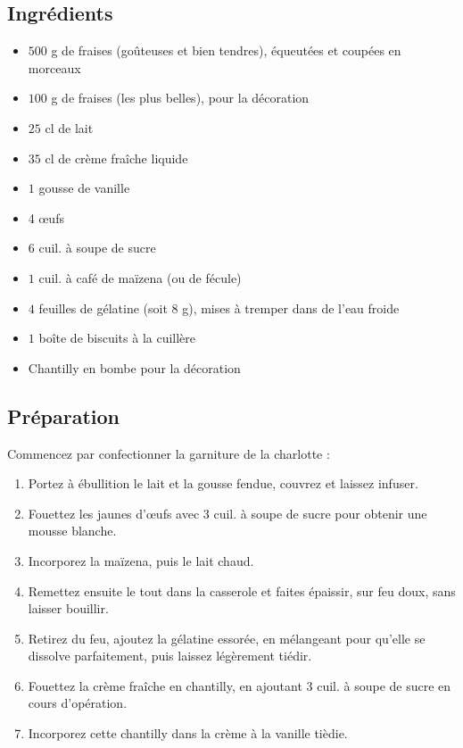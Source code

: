 \subsection*{Ingrédients}
\begin{itemize}
\item $500$ g de fraises (goûteuses et bien tendres), équeutées et coupées en morceaux
\item $100$ g de fraises (les plus belles), pour la décoration
\item $25$ cl de lait
\item $35$ cl de crème fraîche liquide
\item $1$ gousse de vanille
\item 4 œufs
\item $6$ cuil. à soupe de sucre
\item $1$ cuil. à café de maïzena (ou de fécule)
\item $4$ feuilles de gélatine (soit 8 g), mises à tremper dans de l'eau froide
\item $1$ boîte de biscuits à la cuillère
\item Chantilly en bombe pour la décoration
\end{itemize}

\subsection*{Préparation}
Commencez par confectionner la garniture de la charlotte :

\begin{enumerate}
\item Portez à ébullition le lait et la gousse fendue, couvrez et laissez infuser.
\item Fouettez les jaunes d'œufs avec 3 cuil. à soupe de sucre pour obtenir une mousse blanche.
\item Incorporez la maïzena, puis le lait chaud.
\item Remettez ensuite le tout dans la casserole et faites épaissir, sur feu doux, sans laisser bouillir.
\item Retirez du feu, ajoutez la gélatine essorée, en mélangeant pour qu'elle se dissolve parfaitement, puis laissez légèrement tiédir.
\item Fouettez la crème fraîche en chantilly, en ajoutant 3 cuil. à soupe de sucre en cours d'opération.
\item Incorporez cette chantilly dans la crème à la vanille tièdie.
\end{enumerate}

